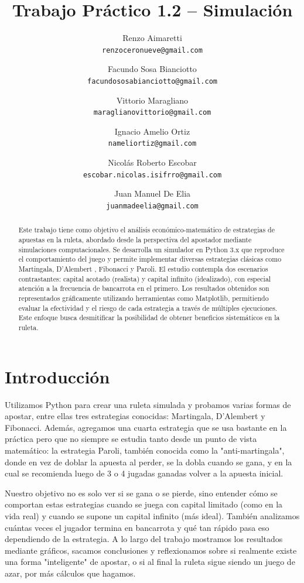 \documentclass{article}
\title{Trabajo Práctico 1.2 -- Simulación}
\author{
    Renzo Aimaretti \\ \texttt{renzoceronueve@gmail.com}
    \and
    Facundo Sosa Bianciotto \\ \texttt{facundososabianciotto@gmail.com}
    \and
    Vittorio Maragliano \\ \texttt{maraglianovittorio@gmail.com}
    \and
    Ignacio Amelio Ortiz \\ \texttt{nameliortiz@gmail.com}
    \and
    Nicolás Roberto Escobar \\ \texttt{escobar.nicolas.isifrro@gmail.com}
    \and
    Juan Manuel De Elia \\ \texttt{juanmadeelia@gmail.com}
}
\begin{document}
\maketitle

\begin{abstract}
Este trabajo tiene como objetivo el análisis económico-matemático de estrategias de apuestas en la ruleta, abordado desde la perspectiva del apostador mediante simulaciones computacionales. Se desarrolla un simulador en Python 3.x que reproduce el comportamiento del juego y permite implementar diversas estrategias clásicas como Martingala, D’Alembert , Fibonacci y Paroli. El estudio contempla dos escenarios contrastantes: capital acotado (realista) y capital infinito (idealizado), con especial atención a la frecuencia de bancarrota en el primero. Los resultados obtenidos son representados gráficamente utilizando herramientas como Matplotlib, permitiendo evaluar la efectividad y el riesgo de cada estrategia a través de múltiples ejecuciones. Este enfoque busca desmitificar la posibilidad de obtener beneficios sistemáticos en la ruleta.
\end{abstract}

\section{Introducción}
Utilizamos Python para crear una ruleta simulada y probamos varias formas de apostar, entre ellas tres estrategias conocidas: Martingala, D’Alembert y Fibonacci. Además, agregamos una cuarta estrategia que se usa bastante en la práctica pero que no siempre se estudia tanto desde un punto de vista matemático: la estrategia Paroli, también conocida como la "anti-martingala", donde en vez de doblar la apuesta al perder, se la dobla cuando se gana, y en la cual se recomienda luego de 3 o 4 jugadas ganadas volver a la apuesta inicial.

Nuestro objetivo no es solo ver si se gana o se pierde, sino entender cómo se comportan estas estrategias cuando se juega con capital limitado (como en la vida real) y cuando se supone un capital infinito (más ideal). También analizamos cuántas veces el jugador termina en bancarrota y qué tan rápido pasa eso dependiendo de la estrategia. A lo largo del trabajo mostramos los resultados mediante gráficos, sacamos conclusiones y reflexionamos sobre si realmente existe una forma "inteligente" de apostar, o si al final la ruleta sigue siendo un juego de azar, por más cálculos que hagamos.
\end{document}
